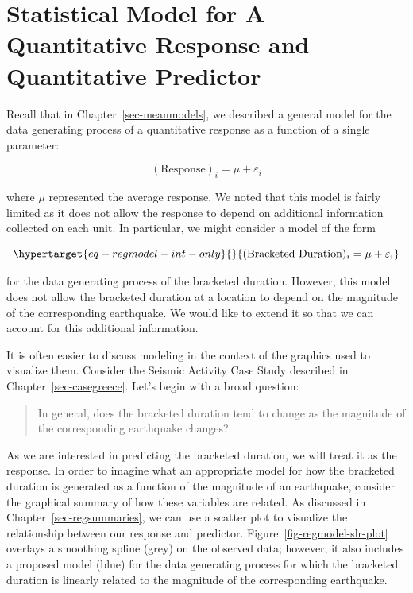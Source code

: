 \documentclass[
  letterpaper,
  DIV=11,
  numbers=noendperiod]{scrreprt}
\theoremstyle{plain}
\theoremstyle{definition}
\theoremstyle{definition}
\theoremstyle{remark}
\begin{document}
\hypertarget{statistical-model-for-a-quantitative-response-and-quantitative-predictor}{%
\section{Statistical Model for A Quantitative Response and Quantitative
Predictor}\label{statistical-model-for-a-quantitative-response-and-quantitative-predictor}}

Recall that in Chapter~\ref{sec-meanmodels}, we described a general
model for the data generating process of a quantitative response as a
function of a single parameter:

\[(\text{Response})_i = \mu + \varepsilon_i\]

where \(\mu\) represented the average response. We noted that this model
is fairly limited as it does not allow the response to depend on
additional information collected on each unit. In particular, we might
consider a model of the form

\begin{equation}\protect\hypertarget{eq-regmodel-int-only}{}{(\text{Bracketed Duration})_i = \mu + \varepsilon_i}\label{eq-regmodel-int-only}\end{equation}

for the data generating process of the bracketed duration. However, this
model does not allow the bracketed duration at a location to depend on
the magnitude of the corresponding earthquake. We would like to extend
it so that we can account for this additional information.

It is often easier to discuss modeling in the context of the graphics
used to visualize them. Consider the Seismic Activity Case Study
described in Chapter~\ref{sec-casegreece}. Let's begin with a broad
question:

\begin{quote}
In general, does the bracketed duration tend to change as the magnitude
of the corresponding earthquake changes?
\end{quote}

As we are interested in predicting the bracketed duration, we will treat
it as the response. In order to imagine what an appropriate model for
how the bracketed duration is generated as a function of the magnitude
of an earthquake, consider the graphical summary of how these variables
are related. As discussed in Chapter~\ref{sec-regsummaries}, we can use
a scatter plot to visualize the relationship between our response and
predictor. Figure~\ref{fig-regmodel-slr-plot} overlays a smoothing
spline (grey) on the observed data; however, it also includes a proposed
model (blue) for the data generating process for which the bracketed
duration is linearly related to the magnitude of the corresponding
earthquake.
\end{document}

